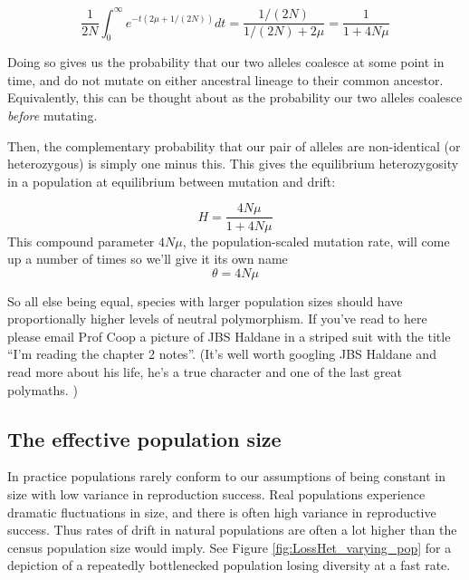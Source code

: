 \begin{equation}
\frac{1}{2N} \int_0^{\infty} e^{-t(2\mu+1/(2N))} dt =
\frac{1/(2N)}{1/(2N)+2\mu} = \frac{1}{1+4N\mu}
\end{equation}

Doing so gives us the probability that our two alleles coalesce at some point
in time, and do not mutate on either ancestral lineage to their common
ancestor. Equivalently, this can be thought about as the probability our two
alleles coalesce \emph{before} mutating. 

Then, the complementary probability that our pair of alleles are non-identical
(or heterozygous) is simply one minus this. This gives the equilibrium
heterozygosity in a population at equilibrium between mutation and drift:

\begin{equation}
  H = \frac{4N\mu}{1+4N\mu} \label{eqn:hetero}
\end{equation}
This compound parameter $4N\mu$, the population-scaled mutation rate,
will come up a number of times so we'll give it its own name
\begin{equation}
\theta = 4N\mu
\end{equation}

So all else being equal, species with larger population sizes should
have proportionally higher levels of neutral polymorphism.  If you've read to here please email Prof Coop a picture of JBS Haldane
in a striped suit with the title ``I'm reading the chapter 2 notes''. (It's well worth googling JBS Haldane and read more about his life,
he's a true character and one of the last great polymaths. )

\subsection{The effective population size}

In practice populations rarely conform to our assumptions of being
constant in size with low variance in reproduction success. Real
populations experience dramatic fluctuations in size, and there is
often high variance in reproductive success. Thus rates of drift in
natural populations are often a lot higher than the census population
size would imply. See Figure \ref{fig:LossHet_varying_pop}  for a depiction of
a repeatedly bottlenecked population losing diversity at a fast rate.

